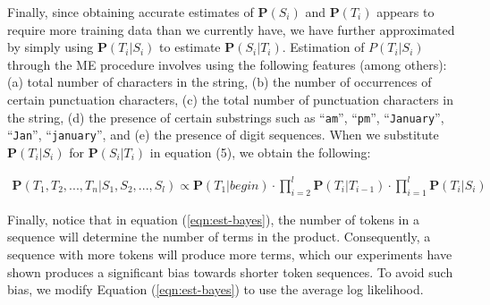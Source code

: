 Finally, since obtaining accurate estimates of 
$\mathbf{P}(S_i)$ and $\mathbf{P}(T_i)$ appears to require more training
data than we currently have, we have further approximated by simply
using
$\mathbf{P}(T_i|S_i)$ to estimate $\mathbf{P}(S_i|T_i)$.
Estimation of $P(T_i|S_i)$ through the ME procedure involves using
the following features (among others):
(a) total number of characters in the string,
(b) the number of occurrences of certain punctuation characters,
(c) the total number of punctuation characters in the string,
(d) the presence of certain substrings such as ``{\tt am}'', ``{\tt pm}'', 
``{\tt January}'', ``{\tt Jan}'', ``{\tt january}'', and
(e) the presence of digit sequences.
When we substitute $\mathbf{P}(T_i|S_i)$ for
 $\mathbf{P}(S_i|T_i)$ in equation (5), we obtain the following:

\begin{eqnarray}\label{eqn:est-bayes}
\mathbf{P}(T_1, T_2, ..., T_n|S_1, S_2, ..., S_l) \propto
\mathbf{P}(T_1|begin) \cdot \prod_{i=2}^{l}\mathbf{P}(T_i|T_{i-1})
\cdot \prod_{i=1}^{l}\mathbf{P}(T_i|S_i)
\end{eqnarray}

Finally, notice that in equation (\ref{eqn:est-bayes}), the number of tokens
in a sequence will determine the number of terms in the product. 
Consequently, a sequence with more tokens will produce
more terms, which our experiments have shown produces a significant 
bias towards shorter token sequences.  
To avoid such bias, we modify
Equation (\ref{eqn:est-bayes}) to use the average log likelihood.

